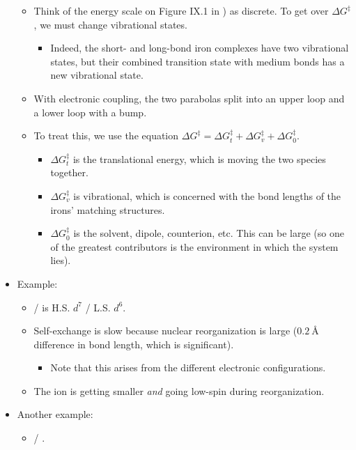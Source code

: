 \documentclass[../notes.tex]{subfiles}
\begin{document}
\begin{itemize}
\begin{itemize}
        \item Think of the energy scale on Figure IX.1 in \textcite{bib:CHEM20100Notes}) as discrete. To get over $\Delta G^\ddagger$, we must change vibrational states.
        \begin{itemize}
            \item Indeed, the short- and long-bond iron complexes have two vibrational states, but their combined transition state with medium bonds has a new vibrational state.
        \end{itemize}
        \item With electronic coupling, the two parabolas split into an upper loop and a lower loop with a bump.
        \item To treat this, we use the equation $\Delta G^\ddagger=\Delta G^\ddagger_t+\Delta G^\ddagger_v+\Delta G^\ddagger_0$.
        \begin{itemize}
            \item $\Delta G^\ddagger_t$ is the translational energy, which is moving the two species together.
            \item $\Delta G^\ddagger_v$ is vibrational, which is concerned with the bond lengths of the irons' matching structures.
            \item $\Delta G^\ddagger_0$ is the solvent, dipole, counterion, etc. This can be large (so one of the greatest contributors is the environment in which the system lies).
        \end{itemize}
    \end{itemize}
    \item Example:
    \begin{itemize}
        \item {} /  is H.S. $d^7$ / L.S. $d^6$.
        \item Self-exchange is slow because nuclear reorganization is large ($\SI{0.2}{\angstrom}$ difference in bond length, which is significant).
        \begin{itemize}
            \item Note that this arises from the different electronic configurations.
        \end{itemize}
        \item The ion is getting smaller \emph{and} going low-spin during reorganization.
    \end{itemize}
    \item Another example:
    \begin{itemize}
        \item {} / .

\end{itemize}
\end{itemize}
\end{document}
